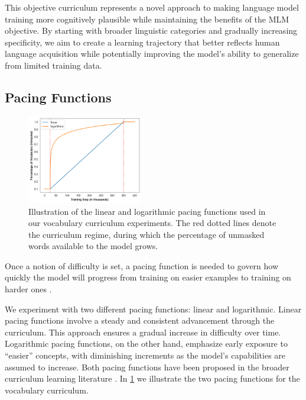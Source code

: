This objective curriculum represents a novel approach to making language model training more cognitively plausible while maintaining the benefits of the MLM objective. By starting with broader linguistic categories and gradually increasing specificity, we aim to create a learning trajectory that better reflects human language acquisition while potentially improving the model's ability to generalize from limited training data.

\subsection{Pacing Functions} 

\begin{figure}
    \centering
    \includegraphics[width=0.45\textwidth]{chapters/climb/figures/pacing_fns.png}
    \caption{Illustration of the linear and logarithmic pacing functions used in our vocabulary curriculum experiments. The red dotted lines denote the curriculum regime, during which the percentage of unmasked words available to the model grows.}
    \label{fig:pacing_fn}
\end{figure}

Once a notion of difficulty is set, a pacing function is needed to govern how quickly the model will progress from training on easier examples to training on harder ones \cite{wu2021when}.

We experiment with two different pacing functions: linear and logarithmic. Linear pacing functions involve a steady and consistent advancement through the curriculum. This approach ensures a gradual increase in difficulty over time. Logarithmic pacing functions, on the other hand, emphasize early exposure to ``easier'' concepts, with diminishing increments as the model's capabilities are assumed to increase. Both pacing functions have been proposed in the broader curriculum learning literature \citep{bai2022better, li2021curriculum, wu2021when}. In \cref{fig:pacing_fn} we illustrate the two pacing functions for the vocabulary curriculum.

